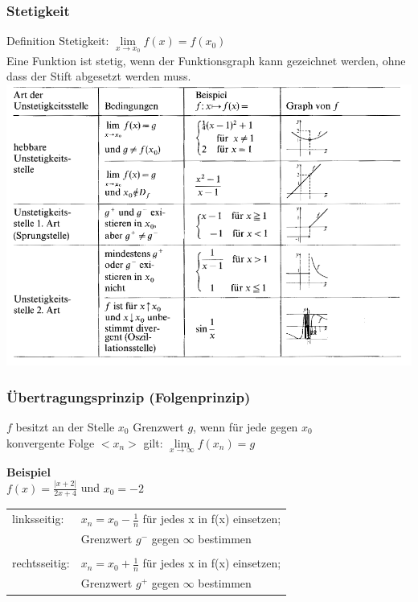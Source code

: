 		\subsubsection{Stetigkeit}
			Definition Stetigkeit: $\lim \limits_{x \to x_0} f(x) = f(x_0)$ \\
			Eine Funktion ist stetig, wenn der Funktionsgraph kann gezeichnet werden, ohne dass der Stift abgesetzt werden muss. \\
			\includegraphics[width=0.9\linewidth]{Bilder/stetigkeit} \\

		\subsubsection{Übertragungsprinzip (Folgenprinzip)}
			$f$ besitzt an der Stelle $x_0$ Grenzwert $g$, wenn für jede gegen $x_0$\\
			konvergente Folge $< x_n >$ gilt: $\lim\limits_{x \to \infty} f(x_n) = g$ 
			
			\textbf{Beispiel} \\
				$f(x) = \frac{\vert x + 2 \vert}{2x+4}$ und $x_0 = -2$ \\
				\begin{tabular}{ll}
					linksseitig: & $x_n = x_0 - \frac{1}{n}$ für jedes x in f(x) einsetzen; \\
					& Grenzwert $g^-$ gegen $\infty$ bestimmen \\
					\\
					rechtsseitig: & $x_n = x_0 + \frac{1}{n}$ für jedes x in f(x) einsetzen; \\
					& Grenzwert $g^+$ gegen $\infty$ bestimmen \\
				\end{tabular}
			

